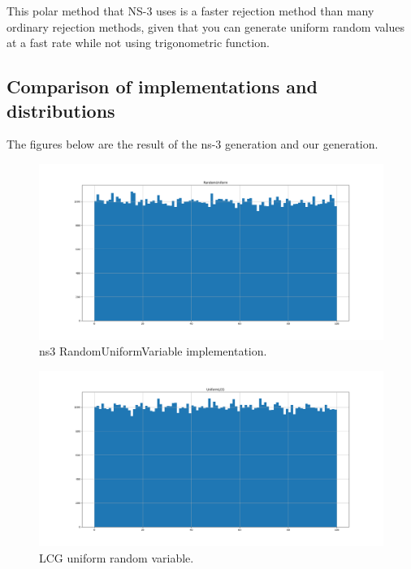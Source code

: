 \documentclass{article}
\begin{document}
  This polar method that NS-3 uses is a faster rejection method than many ordinary rejection methods, given that you can generate uniform random values at a fast rate while not using trigonometric function. 
  \subsection{Comparison of implementations and distributions}
  The figures below are the result of the ns-3 generation and our generation.
  \begin{figure}[h!]
    \centering
    \includegraphics[width=\linewidth]{ns3uniform.png}
    \caption{ns3 RandomUniformVariable implementation.}
    \label{fig:ns-3ruv}
  \end{figure}
  
  \begin{figure}[h!]
    \centering
    \includegraphics[width=\linewidth]{uniformLCG.png}
    \caption{LCG uniform random variable.}
    \label{fig:lcgruv}
  \end{figure}
\end{document}
